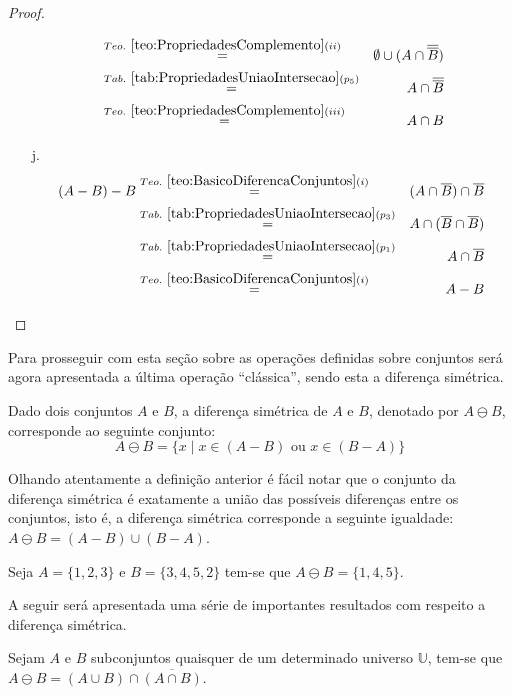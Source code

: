 \begin{proof}
\begin{itemize}
\begin{eqnarray*}
			& \stackrel{Teo. \ \ref{teo:PropriedadesComplemento}(ii)}{=}& \emptyset  \cup (A \cap \overline{\overline{B}})\\
			& \stackrel{Tab. \ \ref{tab:PropriedadesUniaoIntersecao}(p_5)}{=}& A \cap \overline{\overline{B}}\\
			& \stackrel{Teo. \ \ref{teo:PropriedadesComplemento}(iii)}{=}& A \cap B
		\end{eqnarray*}
		\item[j.]
		\begin{eqnarray*}
			(A - B) - B & \stackrel{Teo. \  \ref{teo:BasicoDiferencaConjuntos}(i)}{=} & (A \cap \overline{B}) \cap \overline{B}\\
			& \stackrel{Tab. \ \ref{tab:PropriedadesUniaoIntersecao}(p_3)}{=}& A \cap (\overline{B} \cap \overline{B})\\
			& \stackrel{Tab. \ \ref{tab:PropriedadesUniaoIntersecao}(p_1)}{=}& A \cap \overline{B}\\
			& \stackrel{Teo. \  \ref{teo:BasicoDiferencaConjuntos}(i)}{=} & A - B
		\end{eqnarray*}
	\end{itemize}
\end{proof}

Para prosseguir com esta seção sobre as operações definidas sobre conjuntos será agora apresentada a última operação ``clássica'', sendo esta a diferença simétrica.

\begin{definition}\label{def:DiferencaSimetricaConjuntos}
	Dado dois conjuntos $A$ e $B$, a diferença simétrica de $A$ e $B$, denotado por $A \ominus B$, corresponde ao seguinte conjunto:
	$$A \ominus B = \{x \mid x \in (A - B) \mbox{ ou } x \in (B - A)\}$$
\end{definition}

Olhando atentamente a definição anterior é fácil notar que o conjunto da diferença simétrica é exatamente a união das possíveis diferenças entre os conjuntos, isto é, a diferença simétrica corresponde a seguinte igualdade: $A \ominus B = (A - B) \cup (B - A)$.

\begin{example}
	Seja $A = \{1, 2, 3\}$ e $B = \{3, 4, 5, 2\}$ tem-se que $A \ominus B = \{1, 4, 5\}$.
\end{example}

A seguir será apresentada uma série de importantes resultados com respeito a diferença simétrica.

\begin{theorem}\label{teo:PropriedadeBasicaDifSimetrica}
	Sejam $A$ e $B$ subconjuntos quaisquer de um determinado universo $\mathbb{U}$, tem-se que $A \ominus B = (A \cup B) \cap \overline{(A \cap B)}$.
\end{theorem}

